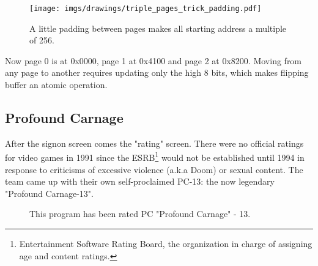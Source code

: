 \documentclass[book.tex]{subfiles}
\begin{document}
\par
\begin{figure}[H]
 \centering
 \texttt{[image: imgs/drawings/triple\_pages\_trick\_padding.pdf]}
 \caption{A little padding between pages makes all starting address a multiple of 256.}
\end{figure}
\par



\par
Now page 0 is at 0x0000, page 1 at 0x4100 and page 2 at 0x8200. Moving from any page to another requires updating only the high 8 bits, which makes flipping buffer an atomic operation.\\












\subsection{Profound Carnage}
After the signon screen comes the "rating" screen. There were no official ratings for video games in 1991 since the ESRB\footnote{Entertainment Software Rating Board, the organization in charge of assigning age and content ratings.} would not be established until 1994 in response to criticisms of excessive violence (a.k.a Doom) or sexual content. The team came up with their own self-proclaimed PC-13: the now legendary "Profound Carnage-13".\\
\begin{figure}[H]
\centering
{}
\caption{This program has been rated PC "Profound Carnage" - 13.}
\end{figure}
\end{document}
